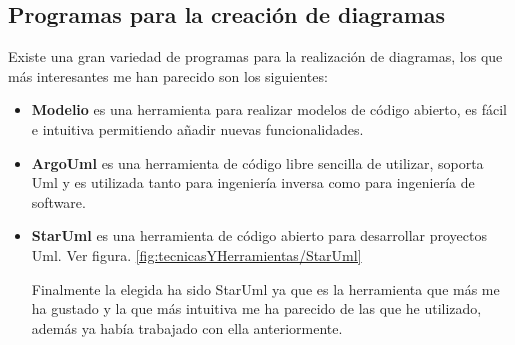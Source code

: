 \subsection{Programas para la creación de diagramas}
Existe una gran variedad de programas para la realización de diagramas, los que más interesantes me han parecido son los siguientes:
 
 \begin{itemize}
 	\item \textbf{Modelio} \cite{Modelio} es una herramienta para realizar modelos de código abierto, es fácil e intuitiva permitiendo añadir nuevas funcionalidades. 
 	\item \textbf{ArgoUml} \cite{ArgoUml} es una herramienta de código libre sencilla de utilizar, soporta Uml y es utilizada tanto para ingeniería inversa como para ingeniería de software.
 	\item \textbf{StarUml} \cite{StarUml} es una herramienta de código abierto para desarrollar proyectos Uml. Ver figura. \ref{fig:tecnicasYHerramientas/StarUml}
 	
 	Finalmente la elegida ha sido StarUml ya que es la herramienta que más me ha gustado y la que más intuitiva me ha parecido de las que he utilizado, además ya había trabajado con ella anteriormente.
 	
 \end{itemize}


